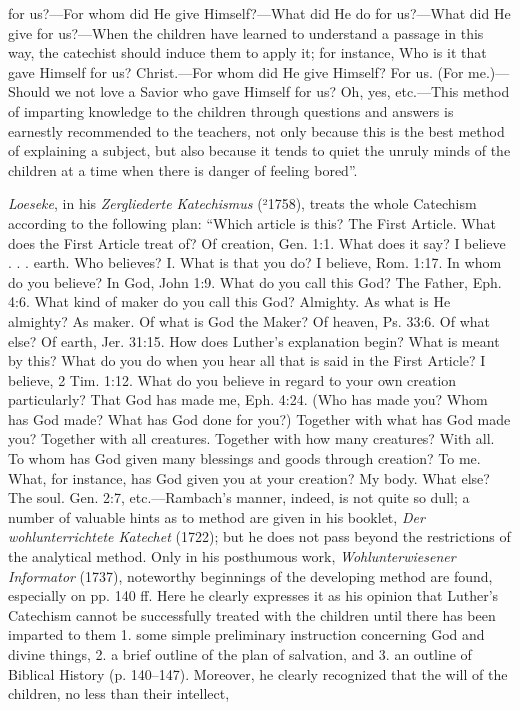for us?—For whom did He give Himself?—What did He do for us?—What did He give for us?—When the children have learned to understand a passage in this way, the catechist should induce them to apply it; for instance, Who is it that gave Himself for us? Christ.—For whom did He give Himself? For us. (For me.)—Should we not love a Savior who gave Himself for us? Oh, yes, etc.—This method of imparting knowledge to the children through questions and answers is earnestly recommended to the teachers, not only because this is the best method of explaining a subject, but also because it tends to quiet the unruly minds of the children at a time when there is danger of feeling bored”.

\emph{Loeseke}, in his \emph{Zergliederte Katechismus} (²1758), treats the whole Catechism according to the following plan: “Which article is this? The First Article. What does the First Article treat of? Of creation, Gen. 1:1. What does it say? I believe . . . earth. Who believes? I. What is that you do? I believe, Rom. 1:17. In whom do you believe? In God, John 1:9. What do you call this God? The Father, Eph. 4:6. What kind of maker do you call this God? Almighty. As what is He almighty? As maker. Of what is God the Maker? Of heaven, Ps. 33:6. Of what else? Of earth, Jer. 31:15. How does Luther’s explanation begin? What is meant by this? What do you do when you hear all that is said in the First Article? I believe, 2 Tim. 1:12. What do you believe in regard to your own creation particularly? That God has made me, Eph. 4:24. (Who has made you? Whom has God made? What has God done for you?) Together with what has God made you? Together with all creatures. Together with how many creatures? With all. To whom has God given many blessings and goods through creation? To me. What, for instance, has God given you at your creation? My body. What else? The soul. Gen. 2:7, etc.—Rambach’s manner, indeed, is not quite so dull; a number of valuable hints as to method are given in his booklet, \emph{Der wohlunterrichtete Katechet} (1722); but he does not pass beyond the restrictions of the analytical method. Only in his posthumous work, \emph{Wohlunterwiesener Informator} (1737), noteworthy beginnings of the developing method are found, especially on pp. 140 ff. Here he clearly expresses it as his opinion that Luther’s Catechism cannot be successfully treated with the children until there has been imparted to them 1. some simple preliminary instruction concerning God and divine things, 2. a brief outline of the plan of salvation, and 3. an outline of Biblical History (p. 140–147). Moreover, he clearly recognized that the will of the children, no less than their intellect,
